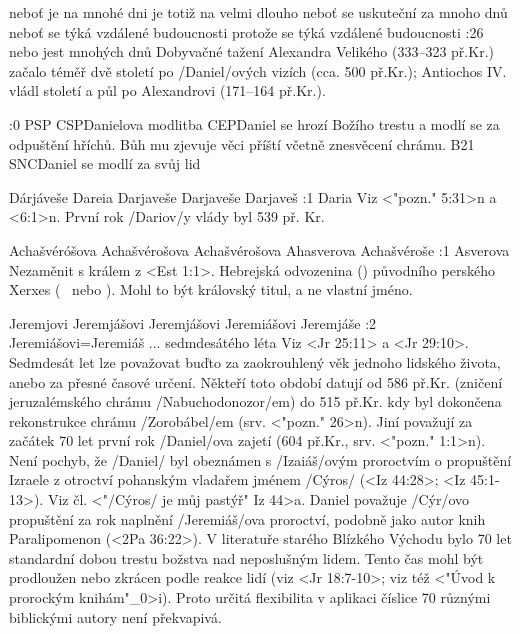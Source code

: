     {neboť je na mnohé dni}      
    {je totiž na velmi dlouho}      
    {neboť se uskuteční za mnoho dnů}      
    {neboť se týká vzdálené budoucnosti}      
    {protože se týká vzdálené budoucnosti}    
:26 {nebo jest mnohých dnů} Dobyvačné tažení Alexandra Velikého (333--323 př.Kr.) začalo téměř dvě století po \x/Daniel/ových vizích (cca. 500 př.Kr.); Antiochos IV. vládl století a půl po Alexandrovi (171--164 př.Kr.). 

:0 {} 
% 
        {PSP}{}%
        {CSP}{Danielova modlitba}%
        {CEP}{Daniel se hrozí Božího trestu a modlí se za odpuštění hříchů.
             Bůh mu zjevuje věci příští včetně znesvěcení chrámu.}%
        {B21}{}%
        {SNC}{Daniel se modlí za svůj lid}%

             
             

    {Dárjáveše}   %
    {Dareia}   %
    {Darjaveše}   %
    {Darjaveše}   %
    {Darjaveš}   %
:1 {Daria} Viz <"pozn." 5:31>n a <6:1>n. První rok \x/Dariov/y vlády byl 539 př. Kr.

 {Achašvéróšova} {Achašvérošova} {Achašvérošova} {Ahasverova} {Achašvéroše}
:1 {Asverova} Nezaměnit s králem z <Est 1:1>.  Hebrejská odvozenina (\Ahasueros) původního perského Xerxes (\Xerxes\  nebo ). Mohl to být královský titul, a ne vlastní jméno. 

   {Jeremjovi}   %
   {Jeremjášovi}   %
   {Jeremjášovi}   %
   {Jeremiášovi}   %
   {Jeremjáše}   %
:2 {Jeremiášovi}={Jeremiáš ... sedmdesátého léta} Viz <Jr 25:11> a <Jr 29:10>.
        Sedmdesát let lze považovat buďto za zaokrouhlený věk jednoho lidského života, anebo za přesné časové určení. Někteří toto období datují od 586 př.Kr. (zničení jeruzalémského chrámu \x/Nabuchodonozor/em) do 515 př.Kr. kdy byl dokončena rekonstrukce chrámu 
        \x/Zorobábel/em (srv. <"pozn." 26>n). Jiní považují za začátek 70 let první rok \x/Daniel/ova zajetí (604 př.Kr., srv. <"pozn." 1:1>n). 
        Není pochyb, že \x/Daniel/ byl obeznámen s \x/Izaiáš/ovým proroctvím o propuštění Izraele z otroctví pohanským vladařem jménem  \x/Cýros/ (<Iz 44:28>; <Iz 45:1-13>).
        Viz čl. <"\x/Cýros/ je můj pastýř" Iz 44>a.
        Daniel považuje \x/Cýr/ovo propuštění za rok naplnění \x/Jeremiáš/ova proroctví, podobně jako autor knih Paralipomenon 
        (<2Pa 36:22>). V literatuře starého Blízkého Východu bylo 70 let standardní dobou trestu božstva nad neposlušným lidem. Tento čas mohl být prodloužen nebo zkrácen podle reakce lidí (viz <Jr 18:7-10>; viz též <"Úvod k prorockým knihám"_0>i). Proto  určitá flexibilita  v aplikaci číslice 70 různými biblickými autory není překvapivá.
        
